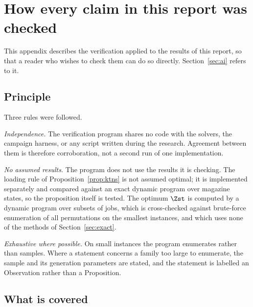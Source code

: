 \section{How every claim in this report was checked}\label{app:verify}

This appendix describes the verification applied to the results of this report, so
that a reader who wishes to check them can do so directly. Section~\ref{sec:ai}
refers to it.

\subsection{Principle}\label{ssec:verify-principle}

Three rules were followed.

\emph{Independence.} The verification program shares no code with the solvers, the
campaign harness, or any script written during the research. Agreement between them is
therefore corroboration, not a second run of one implementation.

\emph{No assumed results.} The program does not use the results it is checking. The
loading rule of Proposition~\ref{prop:ktns} is not assumed optimal; it is implemented
separately and compared against an exact dynamic program over magazine states, so the
proposition itself is tested. The optimum $\Zst$ is computed by a dynamic program over
subsets of jobs, which is cross-checked against brute-force enumeration of all
permutations on the smallest instances, and which uses none of the methods of
Section~\ref{sec:exact}.

\emph{Exhaustive where possible.} On small instances the program enumerates rather than
samples. Where a statement concerns a family too large to enumerate, the sample and its
generation parameters are stated, and the statement is labelled an Observation rather
than a Proposition.

\subsection{What is covered}\label{ssec:verify-covered}

